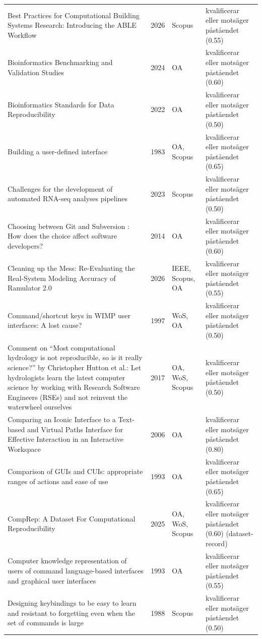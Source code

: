 \begin{longtable}{@{}%
  >{\raggedright\arraybackslash}p{}c%
  >{\raggedright\arraybackslash}p{}%
  >{\raggedright\arraybackslash}p{}@{}}
Best Practices for Computational Building Systems Research: Introducing the ABLE Workflow & 2026 & Scopus & kvalificerar eller motsäger påståendet (0.55) \\
Bioinformatics Benchmarking and Validation Studies & 2024 & OA & kvalificerar eller motsäger påståendet (0.60) \\
Bioinformatics Standards for Data Reproducibility & 2022 & OA & kvalificerar eller motsäger påståendet (0.50) \\
Building a user-defined interface & 1983 & OA, Scopus & kvalificerar eller motsäger påståendet (0.65) \\
Challenges for the development of automated RNA-seq analyses pipelines & 2023 & Scopus & kvalificerar eller motsäger påståendet (0.50) \\
Choosing between Git and Subversion : How does the choice affect software developers? & 2014 & OA & kvalificerar eller motsäger påståendet (0.60) \\
Cleaning up the Mess: Re-Evaluating the Real-System Modeling Accuracy of Ramulator 2.0 & 2026 & IEEE, Scopus, OA & kvalificerar eller motsäger påståendet (0.55) \\
Command/shortcut keys in WIMP user interfaces: A lost cause? & 1997 & WoS, OA & kvalificerar eller motsäger påståendet (0.50) \\
Comment on ``Most computational hydrology is not reproducible, so is it really science?'' by Christopher Hutton et al.: Let hydrologists learn the latest computer science by working with Research Software Engineers (RSEs) and not reinvent the waterwheel ourselves & 2017 & OA, WoS, Scopus & kvalificerar eller motsäger påståendet (0.50) \\
Comparing an Iconic Interface to a Text-based and Virtual Paths Interface for Effective Interaction in an Interactive Workspace & 2006 & OA & kvalificerar eller motsäger påståendet (0.80) \\
Comparison of GUIs and CUIs: appropriate ranges of actions and ease of use & 1993 & OA & kvalificerar eller motsäger påståendet (0.65) \\
CompRep: A Dataset For Computational Reproducibility & 2025 & OA, WoS, Scopus & kvalificerar eller motsäger påståendet (0.60) (dataset-record) \\
Computer knowledge representation of users of command language-based interfaces and graphical user interfaces & 1993 & OA & kvalificerar eller motsäger påståendet (0.55) \\
Designing keybindings to be easy to learn and resistant to forgetting even when the set of commands is large & 1988 & Scopus & kvalificerar eller motsäger påståendet (0.50) \\

\end{longtable}
